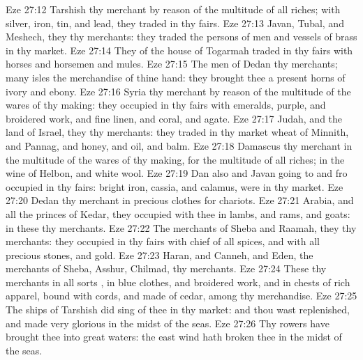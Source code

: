 \vs Eze 27:12 Tarshish  thy merchant by reason of the multitude of all  riches; with silver, iron, tin, and lead, they traded in thy fairs.
\vs Eze 27:13 Javan, Tubal, and Meshech, they  thy merchants: they traded the persons of men and vessels of brass in thy market.
\vs Eze 27:14 They of the house of Togarmah traded in thy fairs with horses and horsemen and mules.
\vs Eze 27:15 The men of Dedan  thy merchants; many isles  the merchandise of thine hand: they brought thee  a present horns of ivory and ebony.
\vs Eze 27:16 Syria  thy merchant by reason of the multitude of the wares of thy making: they occupied in thy fairs with emeralds, purple, and broidered work, and fine linen, and coral, and agate.
\vs Eze 27:17 Judah, and the land of Israel, they  thy merchants: they traded in thy market wheat of Minnith, and Pannag, and honey, and oil, and balm.
\vs Eze 27:18 Damascus  thy merchant in the multitude of the wares of thy making, for the multitude of all riches; in the wine of Helbon, and white wool.
\vs Eze 27:19 Dan also and Javan going to and fro occupied in thy fairs: bright iron, cassia, and calamus, were in thy market.
\vs Eze 27:20 Dedan  thy merchant in precious clothes for chariots.
\vs Eze 27:21 Arabia, and all the princes of Kedar, they occupied with thee in lambs, and rams, and goats: in these  thy merchants.
\vs Eze 27:22 The merchants of Sheba and Raamah, they  thy merchants: they occupied in thy fairs with chief of all spices, and with all precious stones, and gold.
\vs Eze 27:23 Haran, and Canneh, and Eden, the merchants of Sheba, Asshur,  Chilmad,  thy merchants.
\vs Eze 27:24 These  thy merchants in all sorts , in blue clothes, and broidered work, and in chests of rich apparel, bound with cords, and made of cedar, among thy merchandise.
\vs Eze 27:25 The ships of Tarshish did sing of thee in thy market: and thou wast replenished, and made very glorious in the midst of the seas.
\vs Eze 27:26 Thy rowers have brought thee into great waters: the east wind hath broken thee in the midst of the seas.
